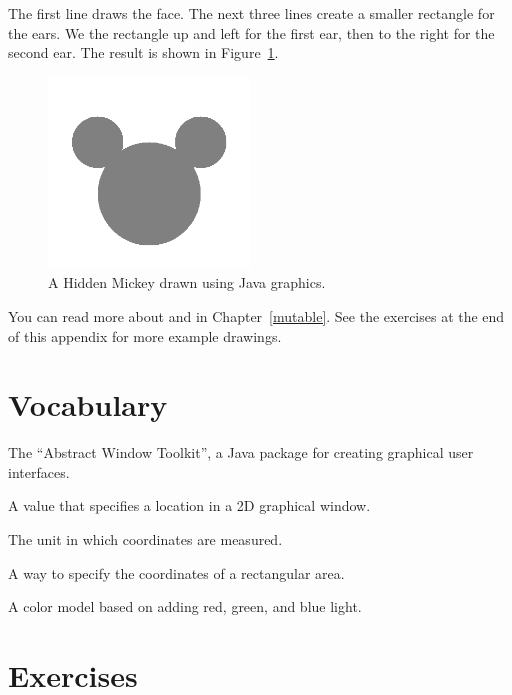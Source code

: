 The first line draws the face.
The next three lines create a smaller rectangle for the ears.
We  the rectangle up and left for the first ear, then to the right for the second ear.
The result is shown in Figure~\ref{fig.mickey}.

\begin{figure}[!ht]
\begin{center}
\includegraphics[height=2in]{figs/mickey.png}
\caption{A Hidden Mickey drawn using Java graphics.}
\label{fig.mickey}
\end{center}
\end{figure}

You can read more about  and  in Chapter~\ref{mutable}.
See the exercises at the end of this appendix for more example drawings.


\section{Vocabulary}

\begin{description}

The ``Abstract Window Toolkit'', a Java package for creating graphical user interfaces.

A value that specifies a location in a 2D graphical window.

The unit in which coordinates are measured.

A way to specify the coordinates of a rectangular area.

A color model based on adding red, green, and blue light.

\end{description}


\section{Exercises}

